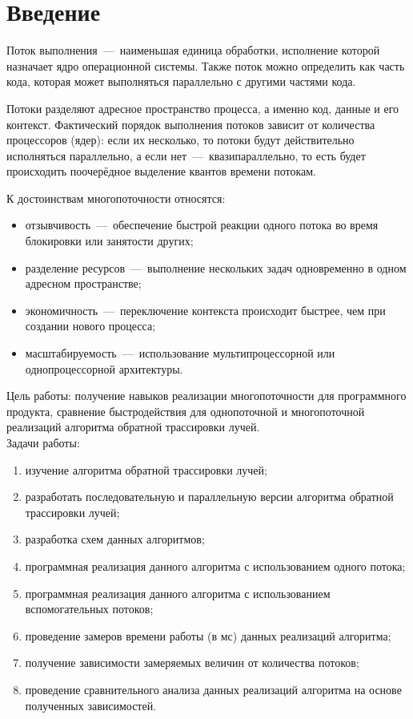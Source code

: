 \setcounter{page}{3}
\chapter*{Введение}
Поток выполнения~---~наименьшая единица обработки, исполнение которой назначает ядро операционной системы. Также поток можно определить как часть кода, которая может выполняться параллельно с другими частями кода.

Потоки разделяют адресное пространство процесса, а именно код, данные и его контекст. Фактический порядок выполнения потоков зависит от количества процессоров (ядер): если их несколько, то потоки будут действительно исполняться параллельно, а если нет~---~квазипараллельно, то есть будет происходить поочерёдное выделение квантов времени потокам.

К достоинствам многопоточности относятся:
\begin{itemize}
	\item отзывчивость~---~обеспечение быстрой реакции одного потока во время блокировки или занятости других;
	\item разделение ресурсов~---~выполнение нескольких задач одновременно в одном адресном пространстве;
	\item экономичность~---~переключение контекста происходит быстрее, чем при создании нового процесса;
	\item масштабируемость~---~использование мультипроцессорной или однопроцессорной архитектуры.
\end{itemize}

Цель работы: получение навыков реализации многопоточности для программного продукта, сравнение быстродействия для однопоточной и многопоточной реализаций алгоритма обратной трассировки лучей.\\

Задачи работы:
\begin{enumerate}[label={\arabic*)}]
	\item изучение алгоритма обратной трассировки лучей;
	\item разработать последовательную и параллельную версии алгоритма обратной трассировки лучей;
	\item разработка схем данных алгоритмов;
	\item программная реализация данного алгоритма с использованием одного потока;
	\item программная реализация данного алгоритма с использованием вспомогательных потоков;
	\item проведение замеров времени работы (в мс) данных реализаций алгоритма; 
	\item получение зависимости замеряемых величин от количества потоков;
	\item проведение сравнительного анализа данных реализаций алгоритма на основе полученных зависимостей.
\end{enumerate}

\newpage